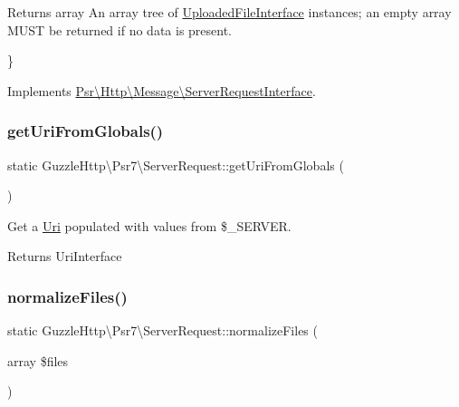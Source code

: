 \begin{DoxyReturn}{Returns}
array An array tree of \hyperlink{interfacePsr_1_1Http_1_1Message_1_1UploadedFileInterface}{Uploaded\+File\+Interface} instances; an empty array M\+U\+ST be returned if no data is present.
\end{DoxyReturn}
\} 

Implements \hyperlink{interfacePsr_1_1Http_1_1Message_1_1ServerRequestInterface_ae89e3ec7f266c270ff9e7572c6d4a23f}{Psr\textbackslash{}\+Http\textbackslash{}\+Message\textbackslash{}\+Server\+Request\+Interface}.

\mbox{\label{classGuzzleHttp_1_1Psr7_1_1ServerRequest_a12900f4d14ead81c214eb58810860c97}} 
\subsubsection{\texorpdfstring{get\+Uri\+From\+Globals()}{getUriFromGlobals()}}
{\footnotesize\ttfamily static Guzzle\+Http\textbackslash{}\+Psr7\textbackslash{}\+Server\+Request\+::get\+Uri\+From\+Globals (\begin{DoxyParamCaption}{ }\end{DoxyParamCaption})\hspace{0.3cm}{\ttfamily [static]}}

Get a \hyperlink{classGuzzleHttp_1_1Psr7_1_1Uri}{Uri} populated with values from \$\+\_\+\+S\+E\+R\+V\+ER.

\begin{DoxyReturn}{Returns}
Uri\+Interface 
\end{DoxyReturn}
\mbox{\label{classGuzzleHttp_1_1Psr7_1_1ServerRequest_a48549f0f7b5b64b5d85bea840cff75bd}} 
\subsubsection{\texorpdfstring{normalize\+Files()}{normalizeFiles()}}
{\footnotesize\ttfamily static Guzzle\+Http\textbackslash{}\+Psr7\textbackslash{}\+Server\+Request\+::normalize\+Files (\begin{DoxyParamCaption}\item[{array}]{\$files }\end{DoxyParamCaption})\hspace{0.3cm}{\ttfamily [static]}}

